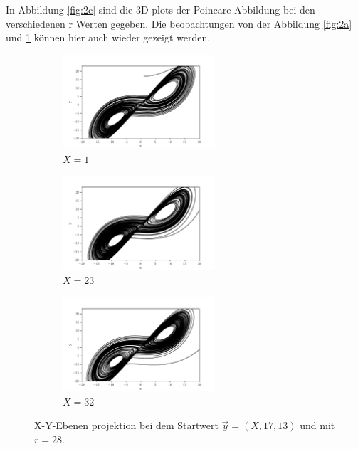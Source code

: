 In Abbildung \ref{fig:2c} sind die 3D-plots der Poincare-Abbildung bei den verschiedenen r Werten gegeben. Die beobachtungen von der Abbildung \ref{fig:2a} und \ref{fig:2b} können hier auch wieder gezeigt werden.
\begin{figure}
    \begin{subfigure}{0.3\textwidth}
        \centering
        \includegraphics[height = 3.5cm]{build/pr28_1.pdf}
        \caption{$X = 1$}
    \end{subfigure}
    \hfill
    \begin{subfigure}{0.3\textwidth}
        \centering
        \includegraphics[height = 3.5cm]{build/pr28_23.pdf}
        \caption{$X = 23$}
    \end{subfigure}
    \hfill
    \begin{subfigure}{0.3\textwidth}
        \centering
        \includegraphics[height = 3.5cm]{build/pr28_32.pdf}
        \caption{$X = 32$}
    \end{subfigure}
    \caption{X-Y-Ebenen projektion bei dem Startwert $\vec{y} = (X, 17, 13)$ und mit $r = 28$.}
    \label{fig:2b}
\end{figure}

